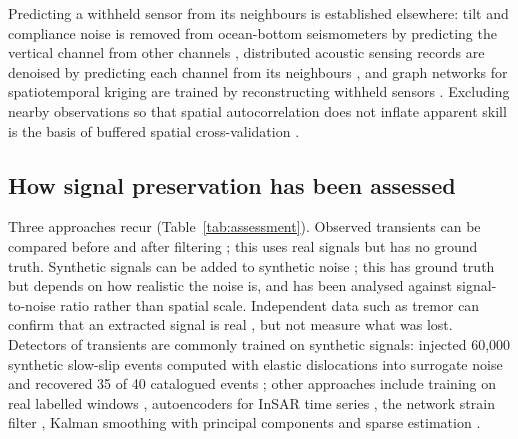 \documentclass[preprint,12pt,authoryear]{elsarticle}
\begin{document}
Predicting a withheld sensor from its neighbours is established elsewhere: tilt and compliance noise is removed from ocean-bottom seismometers by predicting the vertical channel from other channels \citep{crawfordwebb2000, janiszewski2019}, distributed acoustic sensing records are denoised by predicting each channel from its neighbours \citep{batson2019, vandenende2023}, and graph networks for spatiotemporal kriging are trained by reconstructing withheld sensors \citep{wu2021ignnk, cini2022grin, marisca2022spin}. Excluding nearby observations so that spatial autocorrelation does not inflate apparent skill is the basis of buffered spatial cross-validation \citep{lerest2014}.

\subsection{How signal preservation has been assessed}

Three approaches recur (Table~\ref{tab:assessment}). Observed transients can be compared before and after filtering \citep{bachelot2025}; this uses real signals but has no ground truth. Synthetic signals can be added to synthetic noise \citep{costantino2024, mastella2025}; this has ground truth but depends on how realistic the noise is, and has been analysed against signal-to-noise ratio rather than spatial scale. Independent data such as tremor can confirm that an extracted signal is real \citep{costantino2024}, but not measure what was lost. Detectors of transients are commonly trained on synthetic signals: \citet{costantino2023} injected 60,000 synthetic slow-slip events computed with elastic dislocations \citep{okada1992} into surrogate noise and recovered 35 of 40 catalogued events \citep{michel2019}; other approaches include training on real labelled windows \citep{tanaka2025}, autoencoders for InSAR time series \citep{rouetleduc2021}, the network strain filter \citep{ohtani2010}, Kalman smoothing with principal components \citep{jiherring2013} and sparse estimation \citep{riel2014}.
\end{document}
